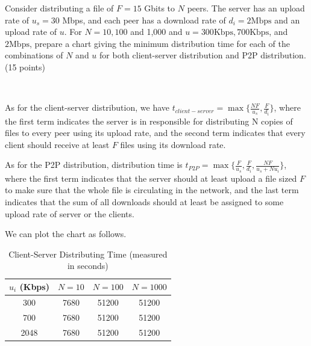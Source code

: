 \begin{exercise}[]{Consider distributing a file of $F=15$ Gbits to $N$ peers. The server has an upload rate of $u_{s}=30$ Mbps, and each peer has a download rate of $d_{i}=2 \mathrm{Mbps}$ and an upload rate of $u$. For $N=10,100$ and 1,000 and $u=300 \mathrm{Kbps}, 700 \mathrm{Kbps}$, and $2 \mathrm{Mbps}$, prepare a chart giving the minimum distribution time for each of the combinations of $N$ and $u$ for both client-server distribution and P2P distribution. (15 points)}
  \begin{solution}
  \par{~}

  As for the client-server distribution, we have $t_{client-server} = \max \{\frac{NF}{u_s}, \frac{F}{d_{i}}\}$, where the first term indicates the server is in responsible for distributing N copies of files to every peer using its upload rate, and the second term indicates that every client should receive at least $F$ files using its download rate.

  As for the P2P distribution, distribution time is $t_{P2P} = \max\{ \frac{F}{u_s}, \frac{F}{d_i}, \frac{NF}{u_s + N u_i}\}$, where the first term indicates that the server should at least upload a file sized $F$ to make sure that the whole file is circulating in the network, and the last term indicates that the sum of all downloads should at least be assigned to some upload rate of server or the clients.

  We can plot the chart as follows.

  \begin{table}[h]
    \centering
    \caption{Client-Server Distributing Time (measured in seconds)}
    \vspace{0.6em}
    \begin{tabular}{cccc}
    \hline
    $u_i$ (Kbps) & $N = 10$ & $N = 100$ & $N = 1000$ \\ \hline
    300          & 7680     & 51200     & 51200      \\
    700          & 7680     & 51200     & 51200      \\
    2048         & 7680     & 51200     & 51200      \\ \hline
    \end{tabular}
  \end{table}


\end{solution}
\end{exercise}
